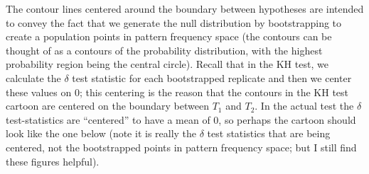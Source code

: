 \documentclass[11pt]{article}
\begin{document}
The contour lines centered around the boundary between hypotheses are intended to convey the fact that we generate the null distribution by bootstrapping to create a population points in pattern frequency space (the contours can be thought of as a contours of the probability distribution, with the highest probability region being the central circle).
Recall that in the KH test, we calculate the $\delta$ test statistic for each bootstrapped replicate and then we center these values on 0; this centering is the reason that the contours in the KH test cartoon are centered on the boundary between $T_1$ and $T_2$.
In the actual test the $\delta$ test-statistics are ``centered'' to have a mean of 0, so perhaps the cartoon should look like the one below (note it is really the $\delta$ test statistics that are being centered, not the bootstrapped points in pattern frequency space; but I still find these figures helpful).
\end{document}
